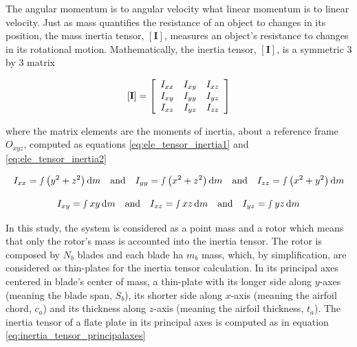 The angular momentum is to angular velocity what linear momentum is to linear velocity. Just as mass quantifies the resistance of an object to changes in its position, the mass inertia tensor, $\left[\mathbf{I}\right]$, measures an object's resistance to changes in its rotational motion. Mathematically, the inertia tensor, $\left[\mathbf{I}\right]$, is a symmetric 3 by 3 matrix 

\begin{equation}
    \left[\mathbf{I}\right]=\left[\begin{array}{c c c}{{I_{x x}}}&{{I_{x y}}}&{{I_{x z}}}\\ {{I_{x y}}}&{{I_{y y}}}&{{I_{y z}}}\\ {{I_{x z}}}&{{I_{y z}}}&{{I_{z z}}}\end{array}\right]
\end{equation}

where the matrix elements are the moments of inertia, about a reference frame $O_{xyz}$, computed as equations \ref{eq:ele_tensor_inertia1} and \ref{eq:ele_tensor_inertia2}

\begin{equation}
    I_{xx} = \smallint  \left( y^2 + z^2 \right) \mathrm{d}m \quad \text{and} \quad I_{yy} = \smallint  \left( x^2 + z^2 \right) \mathrm{d}m \quad \text{and} \quad I_{zz} = \smallint  \left( x^2 + y^2 \right) \mathrm{d}m
    \label{eq:ele_tensor_inertia1}
\end{equation}


\begin{equation}
    I_{xy} = \smallint  xy \, \mathrm{d}m \quad \text{and} \quad I_{xz} = \smallint  xz \, \mathrm{d}m \quad \text{and} \quad I_{yz} = \smallint  yz \, \mathrm{d}m
    \label{eq:ele_tensor_inertia2}
\end{equation}

In this study, the system is considered as a point mass and a rotor which means that only the rotor's mass is accounted into the inertia tensor. The rotor is composed by $N_b$ blades and each blade ha $m_b$ mass, which, by simplification, are considered as thin-plates for the inertia tensor calculation. In its principal axes centered in blade's center of mass, a thin-plate with its longer side along $y$-axes (meaning the blade span, $S_b$), its shorter side along $x$-axis (meaning the airfoil chord, $c_a$) and its thickness along $z$-axis (meaning the airfoil thickness, $t_a$). The inertia tensor of a flate plate in its principal axes is computed as in equation \ref{eq:inertia_tensor_principalaxes}

